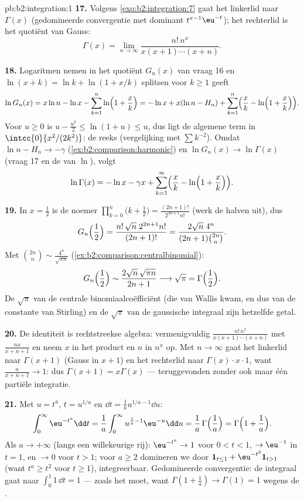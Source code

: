 \begin{solution}{pb:b2:integration:1}
\textbf{17.} Volgens \cref{exo:b2:integration:7} gaat het
linkerlid naar $\Gamma(x)$ (gedomineerde convergentie met dominant
$t^{x-1}\eu^{-t}$); het rechterlid is het quotiënt van Gauss:
\[
\Gamma(x) = \lim_{n\to\infty}
\frac{n!\,n^x}{x(x+1)\cdots(x+n)} .
\]

\textbf{18.} Logaritmen nemen in het quotiënt $G_n(x)$ van vraag
16 en $\ln(x+k) = \ln k + \ln(1 + x/k)$ splitsen voor $k \geq 1$
geeft
\[
\ln G_n(x) = x\ln n - \ln x - \sum_{k=1}^n
\ln\Bigl(1+\frac xk\Bigr)
= -\ln x + x(\ln n - H_n)
+ \sum_{k=1}^n\Bigl(\frac xk -
\ln\Bigl(1+\frac xk\Bigr)\Bigr).
\]
Voor $u \geq 0$ is $u - \frac{u^2}2 \leq \ln(1+u) \leq u$, dus ligt
de algemene term in $\intcc{0}{x^2/(2k^2)}$: de reeks 
(vergelijking met $\sum k^{-2}$). Omdat $\ln n - H_n \to -\gamma$
(\cref{ex:b2:comparison:harmonic}) en $\ln G_n(x) \to
\ln\Gamma(x)$ (vraag 17 en de  van $\ln$), volgt
\[
\ln\Gamma(x) = -\ln x - \gamma x
+ \sum_{k=1}^\infty\Bigl(\frac xk -
\ln\Bigl(1+\frac xk\Bigr)\Bigr) .
\]

\textbf{19.} In $x = \frac12$ is de noemer
$\prod_{k=0}^n\bigl(k+\frac12\bigr) =
\frac{(2n+1)!}{2^{2n+1}n!}$ (werk de halven uit), dus
\[
G_n\Bigl(\frac12\Bigr)
= \frac{n!\,\sqrt n\;2^{2n+1}n!}{(2n+1)!}
= \frac{2\sqrt n\;4^n}{(2n+1)\binom{2n}{n}} .
\]
Met $\binom{2n}{n} \sim \frac{4^n}{\sqrt{\pi n}}$
(\cref{ex:b2:comparison:centralbinomial}):
\[
G_n\Bigl(\frac12\Bigr)
\sim \frac{2\sqrt n\,\sqrt{\pi n}}{2n+1}
\longrightarrow \sqrt\pi = \Gamma\Bigl(\frac12\Bigr) .
\]
De $\sqrt\pi$ van de centrale binomiaalcoëfficiënt (die van Wallis
kwam, en dus van de constante van Stirling) en de $\sqrt\pi$ van de
gaussische integraal zijn hetzelfde getal.

\textbf{20.} De identiteit is rechtstreekse algebra: vermenigvuldig
$\frac{n!\,n^x}{x(x+1)\cdots(x+n)}$ met $\frac{nx}{x+n+1}$ en neem
$x$ in het product en $n$ in $n^x$ op. Met $n \to \infty$ gaat het
linkerlid naar $\Gamma(x+1)$ (Gauss in $x+1$) en het rechterlid
naar $\Gamma(x)\cdot x\cdot 1$, want $\frac{n}{x+n+1} \to 1$: dus
$\Gamma(x+1) = x\Gamma(x)$ --- teruggevonden zonder ook maar één
partiële integratie.

\textbf{21.} Met $u = t^a$, $t = u^{1/a}$ en $\dd t = \frac1a
u^{1/a - 1}\dd u$:
\[
\int_0^\infty \eu^{-t^a}\dd t
= \frac1a\int_0^\infty u^{\frac1a - 1}\eu^{-u}\dd u
= \frac1a\,\Gamma\Bigl(\frac1a\Bigr)
= \Gamma\Bigl(1 + \frac1a\Bigr) .
\]
Als $a \to +\infty$ (langs een willekeurige rij): $\eu^{-t^a} \to
1$ voor $0 < t < 1$, $\to \eu^{-1}$ in $t = 1$, en $\to 0$ voor $t
> 1$; voor $a \geq 2$ domineren we door $\mathbf 1_{t \leq 1} +
\eu^{-t^2}\mathbf 1_{t > 1}$ (want $t^a \geq t^2$ voor $t \geq
1$), integreerbaar. Gedomineerde convergentie: de integraal gaat
naar $\int_0^1 1\,\dd t = 1$ --- zoals het moet, want $\Gamma(1 +
\frac1a) \to \Gamma(1) = 1$ wegens de .


\end{solution}

